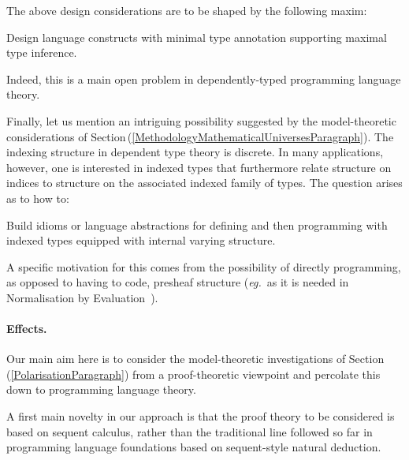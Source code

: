 \documentclass[11pt,twocolumn]{article}
\newcounter{CC}
\newenvironment{resenumerate}
  {\begin{list}{[\textbf{\arabic{CC}]}}
  {\usecounter{CC}
   \setlength{\topsep}{2pt}
   \setlength{\partopsep}{2pt}
   \setlength{\itemsep}{2.5pt}
   \setlength{\parsep}{2.5pt}
   \setlength{\leftmargin}{1.65em}
   \setlength{\labelwidth}{1.15em}
 }}
  {\end{list}}
\newcommand{\hide}[1]{}
\newcommand{\pref}[1]{\,(\ref{#1})}
\newcommand{\eg}{\emph{eg.}}
\begin{document}
\hide{
Dually, we will also:
\begin{resenumerate}\setcounter{CC}{4}
\item
  Develop programming primitives corresponding to coinduction proof
  principles.
\end{resenumerate}
These have received less attention.
}

The above design considerations are to be shaped by the following maxim:
\begin{resenumerate}\setcounter{CC}{4}%
\item
  Design language constructs with minimal type annotation supporting
  maximal type inference.
\end{resenumerate}
Indeed, this is a main open problem in dependently-typed programming language
theory.

Finally, let us mention an intriguing possibility suggested by the
model-theoretic considerations of
Section\pref{MethodologyMathematicalUniversesParagraph}.  The indexing
structure in dependent type theory is discrete.  In many applications,
however, one is interested in indexed types that furthermore relate
structure on indices to structure on the associated indexed family of types.
The question arises as to how to:
\begin{resenumerate}\setcounter{CC}{5}%
\item
  Build idioms or language abstractions for defining and then programming
  with indexed types equipped with internal varying structure.
\end{resenumerate}
A specific motivation for this comes from the possibility of directly
programming, as opposed to having to code, presheaf structure (\eg~as it is
needed in Normalisation by Evaluation~\cite{FiorePPDP}).

\paragraph{Effects.}
\label{ProgrammingEffectsParagraph}

Our main aim here is to consider the model-theoretic investigations of
Section\pref{PolarisationParagraph} from a proof-theoretic viewpoint and
percolate this down to programming language theory.

A first main novelty in our approach is that the proof theory to be
considered is based on sequent calculus, rather than the traditional line
followed so far in programming language foundations based on sequent-style
natural deduction.
\end{document}
